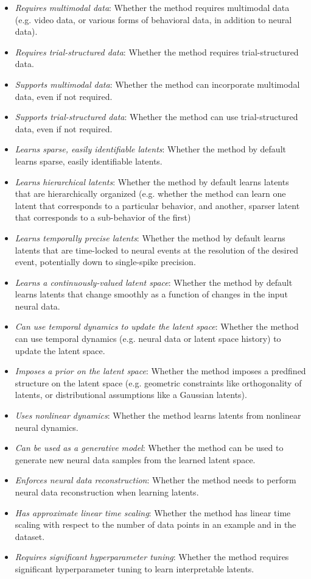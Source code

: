 \begin{itemize}
    \item \textit{Requires multimodal data}: Whether the method requires multimodal data (e.g. video data, or various forms of behavioral data, in addition to neural data).
    \item \textit{Requires trial-structured data}: Whether the method requires trial-structured data.
    \item \textit{Supports multimodal data}: Whether the method can incorporate multimodal data, even if not required.
    \item \textit{Supports trial-structured data}: Whether the method can use trial-structured data, even if not required.
    \item \textit{Learns sparse, easily identifiable latents}: Whether the method by default learns sparse, easily identifiable latents.
    \item \textit{Learns hierarchical latents}: Whether the method by default learns latents that are hierarchically organized (e.g. whether the method can learn one latent that corresponds to a particular behavior, and another, sparser latent that corresponds to a sub-behavior of the first)
    \item \textit{Learns temporally precise latents}: Whether the method by default learns latents that are time-locked to neural events at the resolution of the desired event, potentially down to single-spike precision.
    \item \textit{Learns a continuously-valued latent space}: Whether the method by default learns latents that change smoothly as a function of changes in the input neural data.
    \item \textit{Can use temporal dynamics to update the latent space}: Whether the method can use temporal dynamics (e.g. neural data or latent space history) to update the latent space.
    \item \textit{Imposes a prior on the latent space}: Whether the method imposes a predfined structure on the latent space (e.g. geometric constraints like orthogonality of latents, or distributional assumptions like a Gaussian latents).
    \item \textit{Uses nonlinear dynamics}: Whether the method learns latents from  nonlinear neural dynamics.
    \item \textit{Can be used as a generative model}: Whether the method can be used to generate new neural data samples from the learned latent space.
    \item \textit{Enforces neural data reconstruction}: Whether the method needs to perform neural data reconstruction when learning latents.
    \item \textit{Has approximate linear time scaling}: Whether the method has linear time scaling with respect to the number of data points in an example and in the dataset.
    \item \textit{Requires significant hyperparameter tuning}: Whether the method requires significant hyperparameter tuning to learn interpretable latents.
\end{itemize}

